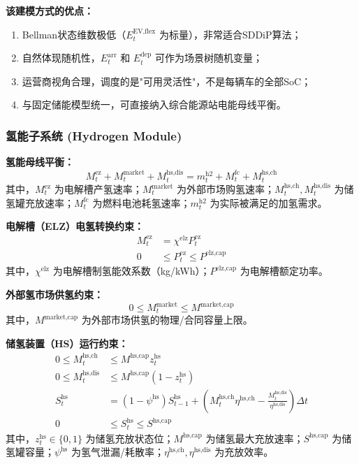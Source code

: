 \documentclass[11pt]{ctexart}
\begin{document}
\textbf{该建模方式的优点：}
\begin{enumerate}[leftmargin=2em, itemsep=2pt, topsep=2pt]
    \item Bellman状态维数极低（$E_{t}^{\text{EV,flex}}$ 为标量），非常适合SDDiP算法；
    \item 自然体现随机性，$E_{t}^{\text{arr}}$ 和 $E_{t}^{\text{dep}}$ 可作为场景树随机变量；
    \item 运营商视角合理，调度的是"可用灵活性"，不是每辆车的全部SoC；
    \item 与固定储能模型统一，可直接纳入综合能源站电能母线平衡。
\end{enumerate}

\subsubsection{氢能子系统 (Hydrogen Module)}

\textbf{氢能母线平衡：}
\begin{equation}
M_{t}^{\text{ez}} + M_{t}^{\text{market}} + M_{t}^{\text{hs,dis}} = m_{t}^{\text{h2}} + M_{t}^{\text{fc}} + M_{t}^{\text{hs,ch}}
\end{equation}
其中，$M_{t}^{\text{ez}}$ 为电解槽产氢速率；$M_{t}^{\text{market}}$ 为外部市场购氢速率；$M_{t}^{\text{hs,ch}}, M_{t}^{\text{hs,dis}}$ 为储氢罐充放速率；$M_{t}^{\text{fc}}$ 为燃料电池耗氢速率；$m_{t}^{\text{h2}}$ 为实际被满足的加氢需求。

\textbf{电解槽（ELZ）电氢转换约束：}
\begin{align}
M_{t}^{\text{ez}} & = \chi^{\text{elz}} P_{t}^{\text{ez}} \\
0 & \le P_{t}^{\text{ez}} \le P^{\text{elz,cap}}
\end{align}
其中，$\chi^{\text{elz}}$ 为电解槽制氢能效系数（kg/kWh）；$P^{\text{elz,cap}}$ 为电解槽额定功率。

\textbf{外部氢市场供氢约束：}
\begin{equation}
0 \le M_{t}^{\text{market}} \le M^{\text{market,cap}}
\end{equation}
其中，$M^{\text{market,cap}}$ 为外部市场供氢的物理/合同容量上限。

\textbf{储氢装置（HS）运行约束：}
\begin{align}
0 \le M_{t}^{\text{hs,ch}} & \le M^{\text{hs,cap}} z_{t}^{\text{hs}} \\
0 \le M_{t}^{\text{hs,dis}} & \le M^{\text{hs,cap}} (1 - z_{t}^{\text{hs}}) \\
S_{t}^{\text{hs}} & = (1 - \psi^{\text{hs}}) S_{t-1}^{\text{hs}} + \left( M_{t}^{\text{hs,ch}} \eta^{\text{hs,ch}} - \frac{M_{t}^{\text{hs,dis}}}{\eta^{\text{hs,dis}}} \right) \Delta t \\
0 & \le S_{t}^{\text{hs}} \le S^{\text{hs,cap}}
\end{align}
其中，$z_{t}^{\text{hs}} \in \{0, 1\}$ 为储氢充放状态位；$M^{\text{hs,cap}}$ 为储氢最大充放速率；$S^{\text{hs,cap}}$ 为储氢罐容量；$\psi^{\text{hs}}$ 为氢气泄漏/耗散率；$\eta^{\text{hs,ch}}, \eta^{\text{hs,dis}}$ 为充放效率。
\end{document}
